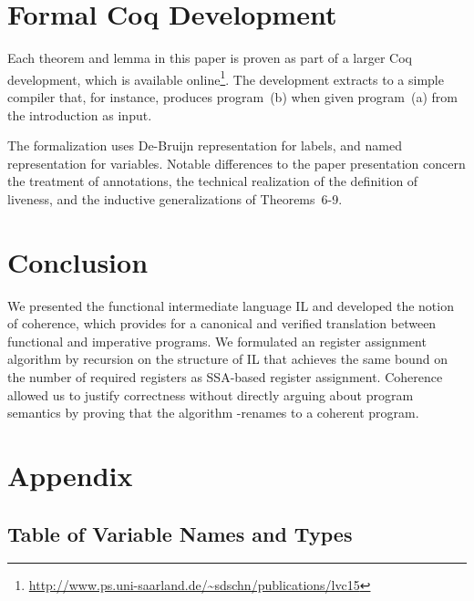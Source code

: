 \documentclass[openright,a4paper,11pt]{scrartcl}
\theoremstyle{plain}
\theoremstyle{plain}
\theoremstyle{plain}
\theoremstyle{plain}
\theoremstyle{nonumberplain}
\begin{document}
\section{Formal Coq Development}
\label{sec:formdev}
Each theorem and lemma in this paper is proven as part of a larger Coq development,
which is available online\footnote{\url{http://www.ps.uni-saarland.de/~sdschn/publications/lvc15}}.
The development extracts to a simple compiler that, for instance, produces program~(b) when given program~(a) from the introduction as input.

The formalization uses De-Bruijn representation for labels, and named representation for variables.
Notable differences to the paper presentation concern the treatment of annotations, the technical realization of the definition of liveness, and the inductive generalizations of Theorems~6-9.

 \section{Conclusion}
We presented the functional intermediate language IL and developed the notion of coherence, which
provides for a canonical and verified translation between functional and imperative programs.
We formulated an register assignment algorithm by recursion on the structure of IL that achieves the same bound on the number of required registers as SSA-based register assignment.
Coherence allowed us to justify correctness without directly arguing about program semantics by proving that the algorithm -renames to a coherent program.

\enlargethispage{6mm}



\label{chap:conclusion}
\label{sec:conclusion}


















\section{Appendix}

\subsection{Table of Variable Names and Types}
\end{document}
